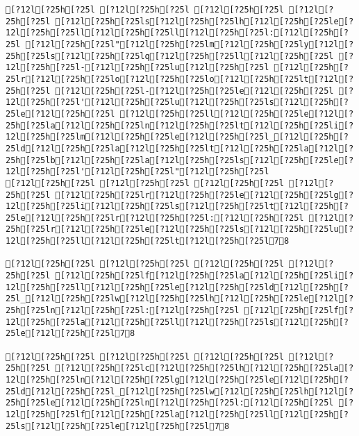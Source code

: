 \documentclass{scrartcl}
\begin{document}
\begin{Verbatim}
[?12l[?25h[?25l [?12l[?25h[?25l [?12l[?25h[?25l [?12l[?25h[?25l [?12l[?25h[?25ls[?12l[?25h[?25lh[?12l[?25h[?25le[?12l[?25h[?25ll[?12l[?25h[?25ll[?12l[?25h[?25l:[?12l[?25h[?25l [?12l[?25h[?25l"[?12l[?25h[?25lm[?12l[?25h[?25ly[?12l[?25h[?25ls[?12l[?25h[?25lq[?12l[?25h[?25ll[?12l[?25h[?25l [?12l[?25h[?25l-[?12l[?25h[?25lu[?12l[?25h[?25l [?12l[?25h[?25lr[?12l[?25h[?25lo[?12l[?25h[?25lo[?12l[?25h[?25lt[?12l[?25h[?25l [?12l[?25h[?25l-[?12l[?25h[?25le[?12l[?25h[?25l [?12l[?25h[?25l'[?12l[?25h[?25lu[?12l[?25h[?25ls[?12l[?25h[?25le[?12l[?25h[?25l [?12l[?25h[?25ll[?12l[?25h[?25le[?12l[?25h[?25la[?12l[?25h[?25ln[?12l[?25h[?25lt[?12l[?25h[?25li[?12l[?25h[?25lm[?12l[?25h[?25le[?12l[?25h[?25l_[?12l[?25h[?25ld[?12l[?25h[?25la[?12l[?25h[?25lt[?12l[?25h[?25la[?12l[?25h[?25lb[?12l[?25h[?25la[?12l[?25h[?25ls[?12l[?25h[?25le[?12l[?25h[?25l'[?12l[?25h[?25l"[?12l[?25h[?25l
[?12l[?25h[?25l [?12l[?25h[?25l [?12l[?25h[?25l [?12l[?25h[?25l [?12l[?25h[?25lr[?12l[?25h[?25le[?12l[?25h[?25lg[?12l[?25h[?25li[?12l[?25h[?25ls[?12l[?25h[?25lt[?12l[?25h[?25le[?12l[?25h[?25lr[?12l[?25h[?25l:[?12l[?25h[?25l [?12l[?25h[?25lr[?12l[?25h[?25le[?12l[?25h[?25ls[?12l[?25h[?25lu[?12l[?25h[?25ll[?12l[?25h[?25lt[?12l[?25h[?25l78

[?12l[?25h[?25l [?12l[?25h[?25l [?12l[?25h[?25l [?12l[?25h[?25l [?12l[?25h[?25lf[?12l[?25h[?25la[?12l[?25h[?25li[?12l[?25h[?25ll[?12l[?25h[?25le[?12l[?25h[?25ld[?12l[?25h[?25l_[?12l[?25h[?25lw[?12l[?25h[?25lh[?12l[?25h[?25le[?12l[?25h[?25ln[?12l[?25h[?25l:[?12l[?25h[?25l [?12l[?25h[?25lf[?12l[?25h[?25la[?12l[?25h[?25ll[?12l[?25h[?25ls[?12l[?25h[?25le[?12l[?25h[?25l78

[?12l[?25h[?25l [?12l[?25h[?25l [?12l[?25h[?25l [?12l[?25h[?25l [?12l[?25h[?25lc[?12l[?25h[?25lh[?12l[?25h[?25la[?12l[?25h[?25ln[?12l[?25h[?25lg[?12l[?25h[?25le[?12l[?25h[?25ld[?12l[?25h[?25l_[?12l[?25h[?25lw[?12l[?25h[?25lh[?12l[?25h[?25le[?12l[?25h[?25ln[?12l[?25h[?25l:[?12l[?25h[?25l [?12l[?25h[?25lf[?12l[?25h[?25la[?12l[?25h[?25ll[?12l[?25h[?25ls[?12l[?25h[?25le[?12l[?25h[?25l78


\end{Verbatim}
\end{document}
